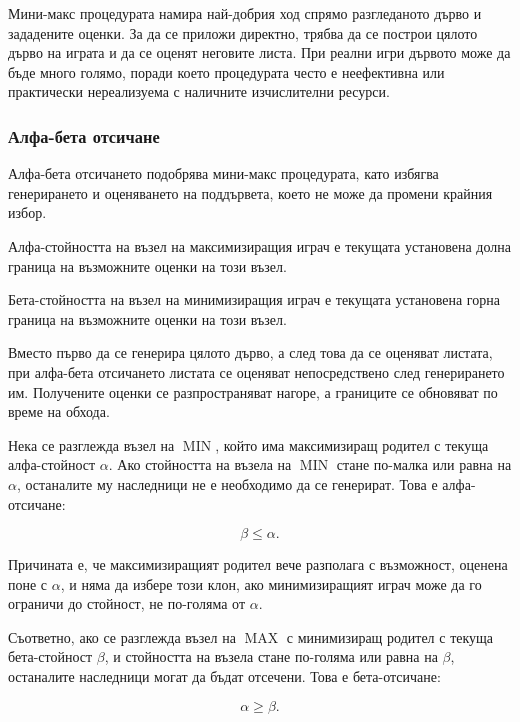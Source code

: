 Мини-макс процедурата намира най-добрия ход спрямо разгледаното дърво и зададените оценки. За да се приложи директно, трябва да се построи цялото дърво на играта и да се оценят неговите листа. При реални игри дървото може да бъде много голямо, поради което процедурата често е неефективна или практически нереализуема с наличните изчислителни ресурси.

\subsubsection{Алфа-бета отсичане}

Алфа-бета отсичането подобрява мини-макс процедурата, като избягва генерирането и оценяването на поддървета, което не може да промени крайния избор.

\begin{defn}
Алфа-стойността на възел на максимизиращия играч е текущата установена долна граница на възможните оценки на този възел.
\end{defn}

\begin{defn}
Бета-стойността на възел на минимизиращия играч е текущата установена горна граница на възможните оценки на този възел.
\end{defn}

Вместо първо да се генерира цялото дърво, а след това да се оценяват листата, при алфа-бета отсичането листата се оценяват непосредствено след генерирането им. Получените оценки се разпространяват нагоре, а границите се обновяват по време на обхода.

Нека се разглежда възел на $\operatorname{MIN}$, който има максимизиращ родител с текуща алфа-стойност $\alpha$. Ако стойността на възела на $\operatorname{MIN}$ стане по-малка или равна на $\alpha$, останалите му наследници не е необходимо да се генерират. Това е алфа-отсичане:

\[
\beta\leq\alpha.
\]

Причината е, че максимизиращият родител вече разполага с възможност, оценена поне с $\alpha$, и няма да избере този клон, ако минимизиращият играч може да го ограничи до стойност, не по-голяма от $\alpha$.

Съответно, ако се разглежда възел на $\operatorname{MAX}$ с минимизиращ родител с текуща бета-стойност $\beta$, и стойността на възела стане по-голяма или равна на $\beta$, останалите наследници могат да бъдат отсечени. Това е бета-отсичане:

\[
\alpha\geq\beta.
\]


